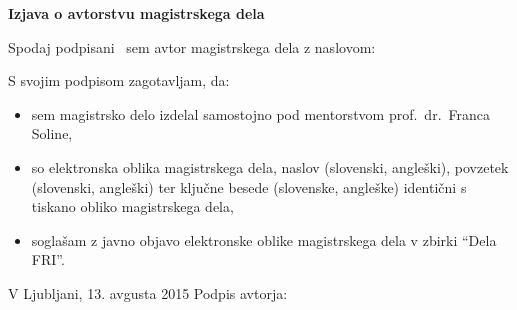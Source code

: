 \vspace*{1cm}
\begin{center}
{\Large \textbf{\sc Izjava o avtorstvu magistrskega dela}}
\end{center}

\vspace{1cm}
\noindent Spodaj podpisani \myname\ sem avtor magistrskega dela z naslovom:

\vspace{0.5cm}
\begin{center}
\emph{\mytitle}
\end{center}

\vspace{1cm}
\noindent S svojim podpisom zagotavljam, da:
\begin{itemize}
    \item sem magistrsko delo izdelal samostojno pod mentorstvom prof.~dr.\ Franca Soline,

    \item so elektronska oblika magistrskega dela, naslov (slovenski, angleški), povzetek (slovenski, angleški) ter ključne besede (slovenske, angleške) identični s tiskano obliko magistrskega dela,
    \item soglašam z javno objavo elektronske oblike magistrskega dela v zbirki ``Dela FRI''.
\end{itemize}

\vspace{1cm}
\noindent V Ljubljani, 13. avgusta 2015 \hfill Podpis avtorja:
